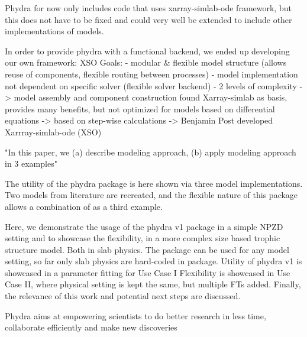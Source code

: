 \documentclass[journal abbreviation, manuscript]{copernicus}
\begin{document}
Phydra for now only includes code that uses xarray-simlab-ode framework, but this does not have to be fixed and could very well be extended to include other implementations of models.

In order to provide phydra with a functional backend, we ended up developing our own framework: XSO
Goals:
- modular & flexible model structure (allows reuse of components, flexible routing between processes)
- model implementation not dependent on specific solver (flexible solver backend)
- 2 levels of complexity -> model assembly and component construction
found Xarray-simlab as basis, provides many benefits, but not optimized for models based on differential equations -> based on step-wise calculations
-> Benjamin Post developed Xarrray-simlab-ode (XSO) 


"In this paper, we (a) describe modeling approach, (b) apply modeling approach in 3 examples"

The utility of the phydra package is here shown via three model implementations. Two models from literature are recreated, and the flexible nature of this package allows a combination of as a third example. 

Here, we demonstrate the usage of the phydra v1 package in a simple NPZD setting and to showcase the flexibility, in a more complex size based trophic structure model. Both in slab physics.
The package can be used for any model setting, so far only slab physics are hard-coded in package.
Utility of phydra v1 is showcased in a parameter fitting for Use Case I
Flexibility is showcased in Use Case II, where physical setting is kept the same, but multiple FTs added.
Finally, the relevance of this work and potential next steps are discussed.

Phydra aims at empowering scientists to do better research in less time, collaborate efficiently and make new discoveries





\clearpage

\end{document}
